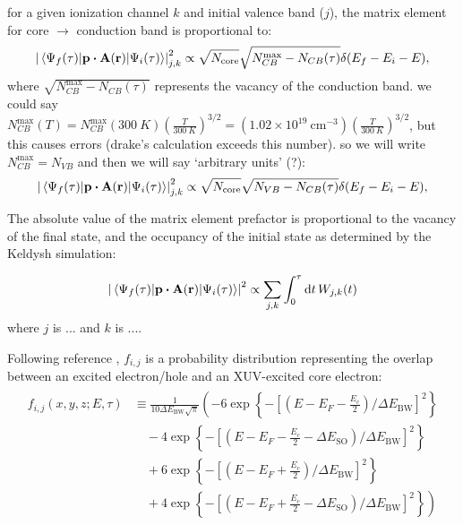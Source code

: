 for a given ionization channel $k$ and initial valence band ($j$), the matrix element for core $\rightarrow$ conduction band is proportional to:
\begin{equation}
\left| \mel{\Psi_f(\tau)}{ \vb{p} \vdot \vb{A}(\vb{r}) }{\Psi_i(\tau)} \right|^2_{j,k}  \propto \sqrt{N_{\textrm{core}}} \sqrt{N_{CB}^{\textrm{max}}-N_{CB}(\tau)} \delta(E_f - E_i-E),
\end{equation}
where $\sqrt{N_{CB}^{\textrm{max}}-N_{CB}(\tau)}$ represents the vacancy of the conduction band. we could say $N_{CB}^{\textrm{max}}(T) = N_{CB}^{\textrm{max}}(300 \ K) \left( \frac{T}{300 \ K}\right)^{3/2} = (1.02 \times 10^{19} \ \textrm{cm}^{-3}) \left( \frac{T}{300 \ K}\right)^{3/2}$, but this causes errors (drake's calculation exceeds this number). so we will write $N_{CB}^{\textrm{max}} = N_{VB}$ and then we will say `arbitrary units' (?):
\begin{equation}
\left| \mel{\Psi_f(\tau)}{ \vb{p} \vdot \vb{A}(\vb{r}) }{\Psi_i(\tau)} \right|^2_{j,k}  \propto \sqrt{N_{\textrm{core}}} \sqrt{N_{VB}-N_{CB}(\tau)} \delta(E_f - E_i-E),
\end{equation}

The absolute value of the matrix element prefactor is proportional to the vacancy of the final state, and the occupancy of the initial state as determined by the Keldysh simulation:

\begin{equation}
\left| \mel{\Psi_f(\tau)}{ \vb{p} \vdot \vb{A}(\vb{r}) }{\Psi_i(\tau)} \right|^2  \propto \sum_{j,k} \int_{0}^{\tau} \dd{t} W_{j,k}(t)
\end{equation}
where $j$ is ... and $k$ is ....

Following reference \cite{zurchDirectSimultaneousObservation2017}, $f_{i,j}$ is a probability distribution representing the overlap between an excited electron/hole and an XUV-excited core electron:
\begin{align}
\begin{split}
f_{i,j}(x, y, z; E, \tau) &\equiv \frac{1}{10 \Delta E_{\textrm{BW}} \sqrt{\pi}} \left( -6 \exp \left\{- \left[ \left(E-E_F-\frac{E_c}{2} \right)/\Delta E_{\textrm{BW}} \right]^2 \right\} \right. \\
&\quad - 4 \exp \left\{- \left[ \left(E-E_F-\frac{E_c}{2}-\Delta E_{\textrm{SO}} \right)/\Delta E_{\textrm{BW}} \right]^2 \right\} \\
&\quad + 6 \exp \left\{- \left[ \left(E-E_F+\frac{E_c}{2} \right)/\Delta E_{\textrm{BW}} \right]^2 \right\} \\
&\left. \quad + 4 \exp \left\{- \left[ \left(E-E_F+\frac{E_c}{2}-\Delta E_{\textrm{SO}} \right)/\Delta E_{\textrm{BW}} \right]^2 \right\} \right)
\end{split}
\label{eqn:f_ij}
\end{align}


